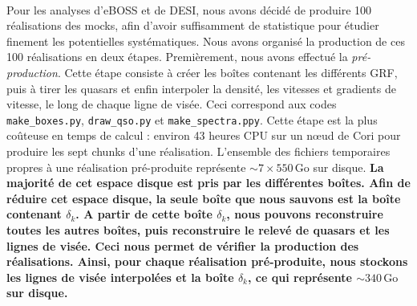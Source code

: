 \documentclass[11pt, twoside, a4paper, openright]{report}
\begin{document}
\paragraph{}
Pour les analyses \lya{} d'eBOSS et de DESI, nous avons décidé de produire \num{100} réalisations des mocks, afin d'avoir suffisamment de statistique pour étudier finement les potentielles systématiques. Nous avons organisé la production de ces 100 réalisations en deux étapes. Premièrement, nous avons effectué la \emph{pré-production}. Cette étape consiste à créer les boîtes contenant les différents GRF, puis à tirer les quasars et enfin interpoler la densité, les vitesses et gradients de vitesse, le long de chaque ligne de visée. Ceci correspond aux codes \texttt{make\_boxes.py}, \texttt{draw\_qso.py} et \texttt{make\_spectra.ppy}. Cette étape est la plus coûteuse en temps de calcul : environ 43 heures CPU sur un n{\oe}ud de Cori pour produire les sept chunks d'une réalisation. L'ensemble des fichiers temporaires propres à une réalisation pré-produite représente $\sim 7 \times \num{550}\,\mathrm{Go}$ sur disque.
\textbf{La majorité de cet espace disque est pris par les différentes boîtes. Afin de réduire cet espace disque, la seule boîte que nous sauvons est la boîte contenant $\delta_k$.  %
  A partir de cette boîte $\delta_k$, nous pouvons reconstruire toutes les autres boîtes, puis reconstruire le relevé de quasars et les lignes de visée. Ceci nous permet de vérifier la production des réalisations.
  Ainsi, pour chaque réalisation pré-produite, nous stockons les lignes de visée interpolées et la boîte $\delta_k$, ce qui représente $\sim \num{340}\,\mathrm{Go}$ sur disque.}
\end{document}
